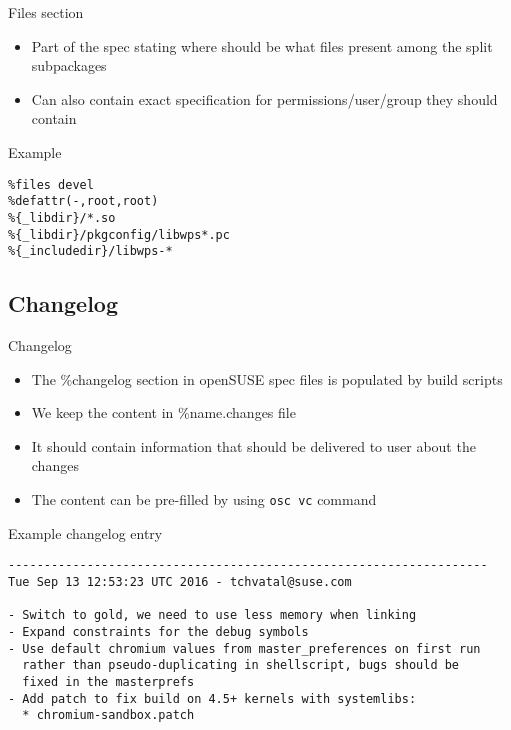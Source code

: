 \documentclass{beamer}
\begin{document}
\begin{frame}[t]{Files section}
	\begin{itemize}
	\item Part of the spec stating where should be what files present among the split subpackages
    \item Can also contain exact specification for permissions/user/group they should contain
	\end{itemize}
\end{frame}

\begin{frame}[fragile]{Example}
	\begin{small}
	\begin{verbatim}
%files devel
%defattr(-,root,root)
%{_libdir}/*.so
%{_libdir}/pkgconfig/libwps*.pc
%{_includedir}/libwps-*
	\end{verbatim}
	\end{small}
\end{frame}

\subsection{Changelog}

\begin{frame}[t]{Changelog}
	\begin{itemize}
	\item The \%changelog section in openSUSE spec files is populated by build scripts
	\item We keep the content in \%{name}.changes file
    \item It should contain information that should be delivered to user about the changes
    \item The content can be pre-filled by using \texttt{osc vc} command
	\end{itemize}
\end{frame}

\begin{frame}[fragile]{Example changelog entry}
	\begin{tiny}
	\begin{verbatim}
-------------------------------------------------------------------
Tue Sep 13 12:53:23 UTC 2016 - tchvatal@suse.com

- Switch to gold, we need to use less memory when linking
- Expand constraints for the debug symbols
- Use default chromium values from master_preferences on first run
  rather than pseudo-duplicating in shellscript, bugs should be
  fixed in the masterprefs
- Add patch to fix build on 4.5+ kernels with systemlibs:
  * chromium-sandbox.patch

	\end{verbatim}
	\end{tiny}
\end{frame}
\end{document}
